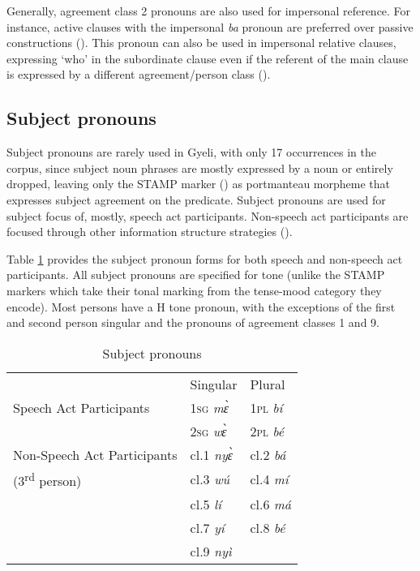 Generally, agreement class 2 pronouns are also used for impersonal reference. For instance, active clauses with the impersonal {\itshape ba} pronoun are preferred over passive constructions (). This pronoun can also be used in impersonal relative clauses, expressing `who' in the subordinate clause even if the referent of the main clause is expressed by a different agreement/person class ().




\subsection{Subject pronouns}
\label{sec:SBJPRO}

Subject pronouns are rarely used in Gyeli, with only 17 occurrences in the corpus, since subject noun phrases are mostly expressed by a noun or entirely dropped, leaving only the STAMP marker () as portmanteau morpheme that expresses subject agreement on the predicate. Subject pronouns are used for subject focus of, mostly, speech act participants. Non-speech act participants are focused through other information structure strategies ().

Table \ref{Tab:SBJpro} provides the subject pronoun forms for both speech and non-speech act participants. All subject pronouns are specified for tone (unlike the STAMP markers which take their tonal marking from the tense-mood category they encode). Most persons have a H tone pronoun, with the exceptions of the first and second person singular and the pronouns of agreement classes 1 and 9.

\begin{table} 
\centering
\begin{tabular}{l|l|l}
 \midrule
 & Singular & Plural \\

Speech Act Participants & 1\textsc{sg} {\itshape mɛ̀} & 1\textsc{pl} {\itshape bí} \\
 & 2\textsc{sg} {\itshape wɛ̀} & 2\textsc{pl} {\itshape bé} \\
 \midrule
Non-Speech Act Participants & cl.1 {\itshape nyɛ̀} & cl.2 {\itshape bá} \\
(3\textsuperscript{rd} person) & cl.3 {\itshape wú} & cl.4  {\itshape mí} \\
& cl.5 {\itshape lí} & cl.6 {\itshape má} \\
 & cl.7 {\itshape yí} & cl.8 {\itshape bé} \\
&  cl.9 {\itshape nyì} & \\
 \midrule
\end{tabular}
\caption{Subject pronouns}
\label{Tab:SBJpro}
\end{table}

